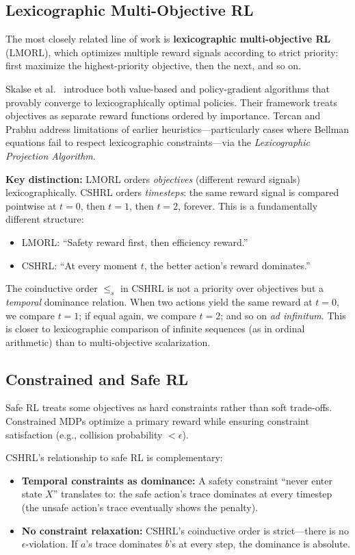 \documentclass[9pt,a4paper]{article}
\theoremstyle{plain}
\theoremstyle{definition}
\theoremstyle{remark}
\begin{document}
\subsection{Lexicographic Multi-Objective RL}

The most closely related line of work is \textbf{lexicographic multi-objective RL} (LMORL), which optimizes multiple reward signals according to strict priority: first maximize the highest-priority objective, then the next, and so on.

Skalse et al.\ \cite{Skalse2022} introduce both value-based and policy-gradient algorithms that provably converge to lexicographically optimal policies. Their framework treats objectives as separate reward functions ordered by importance.
Tercan and Prabhu \cite{Tercan2024} address limitations of earlier heuristics---particularly cases where Bellman equations fail to respect lexicographic constraints---via the \emph{Lexicographic Projection Algorithm}.

\textbf{Key distinction:} LMORL orders \emph{objectives} (different reward signals) lexicographically. CSHRL orders \emph{timesteps}: the same reward signal is compared pointwise at $t=0$, then $t=1$, then $t=2$, forever. This is a fundamentally different structure:
\begin{itemize}
\item LMORL: ``Safety reward first, then efficiency reward.''
\item CSHRL: ``At every moment $t$, the better action's reward dominates.''
\end{itemize}

The coinductive order $\le_s$ in CSHRL is not a priority over objectives but a \emph{temporal} dominance relation. When two actions yield the same reward at $t=0$, we compare $t=1$; if equal again, we compare $t=2$; and so on \emph{ad infinitum}. This is closer to lexicographic comparison of infinite sequences (as in ordinal arithmetic) than to multi-objective scalarization.

\subsection{Constrained and Safe RL}

Safe RL \cite{Garcia2015} treats some objectives as hard constraints rather than soft trade-offs. Constrained MDPs optimize a primary reward while ensuring constraint satisfaction (e.g., collision probability $< \epsilon$).

CSHRL's relationship to safe RL is complementary:
\begin{itemize}
\item \textbf{Temporal constraints as dominance:} A safety constraint ``never enter state $X$'' translates to: the safe action's trace dominates at every timestep (the unsafe action's trace eventually shows the penalty).
\item \textbf{No constraint relaxation:} CSHRL's coinductive order is strict---there is no $\epsilon$-violation. If $a$'s trace dominates $b$'s at every step, the dominance is absolute.
\end{itemize}
\end{document}
